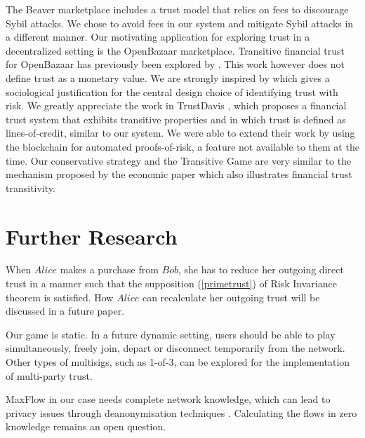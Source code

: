 \documentclass[11pt]{llncs}
\theoremstyle{definition}
\begin{document}
     The Beaver marketplace \cite{beaver} includes a trust model that relies on
     fees to discourage Sybil attacks. We chose to avoid fees in our system and mitigate Sybil attacks in a different manner.
     Our motivating application for exploring trust in a decentralized setting is the OpenBazaar marketplace. Transitive
     financial trust for OpenBazaar has previously been explored by \cite{dionyziz}. This work however does not define trust
     as a monetary value. We are strongly inspired by \cite{kmrs}
     which gives a sociological justification for the central design choice of identifying trust with
     risk. We greatly appreciate the work in TrustDavis \cite{davis}, which proposes a financial trust system that exhibits
     transitive properties and in which trust is defined as lines-of-credit, similar to our system. We were able to extend
     their work by using the blockchain for automated proofs-of-risk, a feature not available to them at the time. Our
     conservative strategy and the Transitive Game are very similar to the mechanism proposed by the economic paper
     \cite{iou} which also illustrates financial trust transitivity. 

  \section{Further Research}

        When $Alice$ makes a purchase from $Bob$, she has to reduce her outgoing direct trust in a manner such that the
        supposition (\ref{primetrust}) of Risk Invariance theorem is satisfied. How $Alice$ can recalculate her outgoing
        trust will be discussed in a future paper.

        Our game is static. In a future dynamic setting, users should be able to play simultaneously, freely join, depart or
        disconnect temporarily from the network. Other types of multisigs, such as 1-of-3, can be explored for the
        implementation of multi-party trust.

        MaxFlow in our case needs complete network knowledge, which can lead to privacy issues through deanonymisation
        techniques \cite{deanonymisation}. Calculating the flows in zero knowledge remains an open question.
\end{document}
